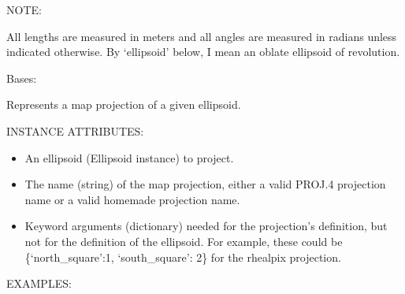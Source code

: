 \documentclass[a4paper,12ptopenany,oneside,english]{sphinxmanual}
\begin{document}
\sphinxAtStartPar
NOTE:

\sphinxAtStartPar
All lengths are measured in meters and all angles are measured in radians
unless indicated otherwise.
By ‘ellipsoid’ below, I mean an oblate ellipsoid of revolution.

\begin{fulllineitems}
\label{\detokenize{projection_wrapper:rhealpixdggs.projection_wrapper.Projection}}
\pysigstartsignatures
{}
\pysigstopsignatures
\sphinxAtStartPar
Bases: 

\sphinxAtStartPar
Represents a map projection of a given ellipsoid.

\sphinxAtStartPar
INSTANCE ATTRIBUTES:
\begin{itemize}
\item {} 
\sphinxAtStartPar
{} \sphinxhyphen{} An ellipsoid (Ellipsoid instance) to project.

\item {} 
\sphinxAtStartPar
{} \sphinxhyphen{} The name (string) of the map projection, either a valid PROJ.4
projection name or a valid homemade projection name.

\item {} 
\sphinxAtStartPar
{} \sphinxhyphen{} Keyword arguments (dictionary) needed for the projection’s
definition, but not for the definition of the ellipsoid.  For example,
these could be \{‘north\_square’:1, ‘south\_square’: 2\} for the rhealpix
projection.

\end{itemize}

\sphinxAtStartPar
EXAMPLES:


\end{fulllineitems}
\end{document}
